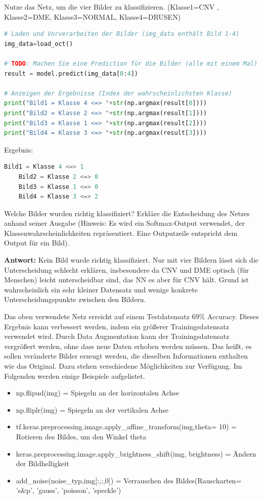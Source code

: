 \documentclass[a4paper,10pt,titlepage]{scrartcl}
\begin{document}
Nutze das Netz, um die vier Bilder zu klassifizieren. (Klasse1=CNV , Klasse2=DME, Klasse3=NORMAL, Klasse4=DRUSEN)

\begin{lstlisting}[language=python]
# Laden und Vorverarbeiten der Bilder (img_data enthält Bild 1-4)
img_data=load_oct()

# TODO: Machen Sie eine Prediction für die Bilder (alle mit einem Mal)
result = model.predict(img_data[0:4])

# Anzeigen der Ergebnisse (Index der wahrscheinlichsten Klasse)
print("Bild1 = Klasse 4 <=> "+str(np.argmax(result[0])))
print("Bild2 = Klasse 2 <=> "+str(np.argmax(result[1])))
print("Bild3 = Klasse 1 <=> "+str(np.argmax(result[2])))
print("Bild4 = Klasse 3 <=> "+str(np.argmax(result[3])))
\end{lstlisting}
Ergebnis:
\begin{lstlisting}[language=python]
    Bild1 = Klasse 4 <=> 1
    Bild2 = Klasse 2 <=> 0
    Bild3 = Klasse 1 <=> 0
    Bild4 = Klasse 3 <=> 2
\end{lstlisting}

Welche Bilder wurden richtig klassifiziert? Erkläre die Entscheidung des Netzes anhand seiner Ausgabe (Hinweis: Es wird ein Softmax-Output verwendet, der Klassenwahrscheinlichkeiten repräsentiert. Eine Outputzeile entspricht dem Output für ein Bild).

\textbf{Antwort:} Kein Bild wurde richtig klassifiziert. Nur mit vier Bildern lässt sich die Unterscheidung schlecht erklären, insbesondere da CNV und DME optisch (für Menschen) leicht unterscheidbar sind, das NN es aber für CNV hält. Grund ist wahrscheinlich ein sehr kleiner Datensatz und wenige konkrete Unterscheidungspunkte zwischen den Bildern.

Das oben verwendete Netz erreicht auf einem Testdatensatz 69\% Accuracy. Dieses Ergebnis kann verbessert werden, indem ein größerer Trainingsdatensatz verwendet wird. Durch Data Augmentation kann der Trainingsdatensatz vergrößert werden, ohne dass neue Daten erhoben werden müssen.
Das heißt, es sollen veränderte Bilder erzeugt werden, die dieselben Informationen enthalten wie das Original. Dazu stehen verschiedene Möglichkeiten zur Verfügung. Im Folgenden werden einige Beispiele aufgelistet.
\begin{itemize}
    \item np.flipud(img) = Spiegeln an der horizontalen Achse
    \item np.fliplr(img) = Spiegeln an der vertikalen Achse
    \item tf.keras.preprocessing.image.apply\_affine\_transform(img,theta= 10) = Rotieren des Bildes, um den Winkel theta
    \item keras.preprocessing.image.apply\_brightness\_shift(img, brightness) = Ändern der Bildhelligkeit
    \item add\_noise(noise\_typ,img[:,:,0]) = Verrauschen des Bildes(Rauscharten= 's\&p', 'gauss', 'poisson', 'speckle')
\end{itemize}
\end{document}
